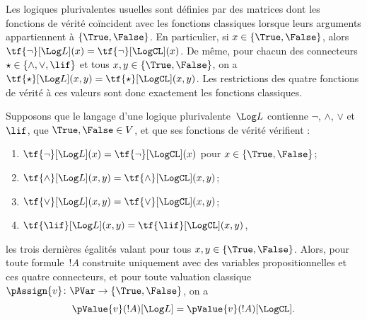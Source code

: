 \documentclass[../../../include/open-logic-section]{subfiles}
\begin{document}


Les logiques plurivalentes usuelles
sont définies par des matrices dont
les fonctions de vérité coïncident
avec les fonctions classiques lorsque
leurs arguments appartiennent à
$\{\True,\False\}$. En particulier,
si $x\in\{\True,\False\}$, alors
$\tf{\lnot}[\Log L](x)
=\tf{\lnot}[\LogCL](x)$.
De même, pour chacun des connecteurs
$\star\in\{\land,\lor,\lif\}$
et tous $x,y\in\{\True,\False\}$,
on a
$\tf{\star}[\Log L](x,y)
=\tf{\star}[\LogCL](x,y)$.
Les restrictions des quatre fonctions
de vérité à ces valeurs sont donc
exactement les fonctions classiques.

\begin{prop}
Supposons que le langage d'une logique
plurivalente~$\Log L$ contienne
$\lnot$, $\land$, $\lor$ et $\lif$,
que $\True,\False\in V$, et que ses
fonctions de vérité vérifient :
\begin{enumerate}
\item{}
  $\tf{\lnot}[\Log L](x)
   =\tf{\lnot}[\LogCL](x)$
  pour $x\in\{\True,\False\}$;
\item{}
  $\tf{\land}[\Log L](x,y)
   =\tf{\land}[\LogCL](x,y)$;
\item{}
  $\tf{\lor}[\Log L](x,y)
   =\tf{\lor}[\LogCL](x,y)$;
\item{}
  $\tf{\lif}[\Log L](x,y)
   =\tf{\lif}[\LogCL](x,y)$,
\end{enumerate}
les trois dernières égalités valant
pour tous $x,y\in\{\True,\False\}$.
Alors, pour toute formule~$!A$
construite uniquement avec des
variables propositionnelles et ces
quatre connecteurs, et pour toute
valuation classique
$\pAssign{v}\colon\PVar\to
\{\True,\False\}$, on a
\[
  \pValue{v}(!A)[\Log L]
    =\pValue{v}(!A)[\LogCL].
\]
\end{prop}
\end{document}

